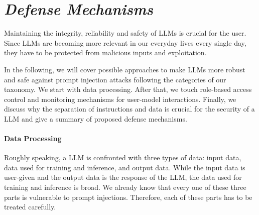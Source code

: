 \section{\textit{Defense Mechanisms}}
Maintaining the integrity, reliability and safety of LLMs is crucial for the user. 
Since LLMs are becoming more relevant in our everyday lives every single day, they have to be protected from malicious inputs and exploitation. 

In the following, we will cover possible approaches to make LLMs more robust and safe against prompt injection attacks following the categories of our taxonomy. 
We start with data processing. 
After that, we touch role-based access control and monitoring mechanisms for user-model interactions. 
Finally, we discuss why the separation of instructions and data is crucial for the security of a LLM and give a summary of proposed defense mechanisms.


\paragraph{Data Processing}
Roughly speaking, a LLM is confronted with three types of data: input data, data used for training and inference, and output data. 
While the input data is user-given and the output data is the response of the LLM, the data used for training and inference is broad.
We already know that every one of these three parts is vulnerable to prompt injections. Therefore, each of these parts has to be treated carefully.

